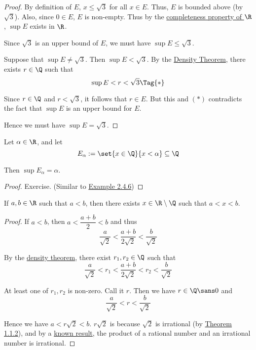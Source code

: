\begin{proof}
  By definition of $E$, $x\leq\sqrt3$ for all $x\in E$. Thus, $E$ is bounded
  above (by $\sqrt3$). Also, since $0\in E$, $E$ is non-empty. Thus by the
  \href{f330cf9}{completeness property of $\R$}, $\sup E$ exists in $\R$.

  Since $\sqrt3$ is an upper bound of $E$, we must have $\sup E\leq\sqrt3$.

  Suppose that $\sup E\neq\sqrt3$. Then $\sup E<\sqrt3$. By the
  \href{d0c9c52}{Density Theorem}, there exists $r\in\Q$ such that
  \begin{equation*}
    \sup E<r<\sqrt3\Tag{*}
  \end{equation*}

  Since $r\in\Q$ and $r<\sqrt3$, it follows that $r\in E$. But this and $(*)$
  contradicts the fact that $\sup E$ is an upper bound for $E$.

  Hence we must have $\sup E=\sqrt3$.
\end{proof}

\label{d4d76b6}

Let $\alpha\in\R$, and let
$$
  E_\alpha:=\set{x\in\Q}{x<\alpha}\subseteq\Q
$$

Then $\sup E_\alpha=\alpha$.

\begin{proof}
  Exercise. (Similar to \href{ade99b7}{Example 2.4.6})
\end{proof}

\label{b0d86cf}

If $a,b\in\R$ such that $a<b$, then there exists $x\in\R\setminus\Q$ such that
$a<x<b$.

\begin{proof}
  If $a<b$, then $a<\dfrac{a+b}2<b$ and thus
  $$
    \frac a{\sqrt2}<\frac{a+b}{2\sqrt2}<\frac b{\sqrt2}
  $$

  By the \href{d0c9c52}{density theorem}, there exist $r_1,r_2\in\Q$ such that
  $$
    \frac a{\sqrt2}<r_1<\frac{a+b}{2\sqrt2}<r_2<\frac b{\sqrt2}
  $$

  At least one of $r_1,r_2$ is non-zero. Call it $r$. Then we have $r\in\Q\sans0$
  and
  $$
    \frac a{\sqrt2}<r<\frac b{\sqrt2}
  $$

  Hence we have $a<r\sqrt2<b$. $r\sqrt2$ is because $\sqrt2$ is irrational (by
  \href{c2585a1}{Theorem 1.1.2}), and by a \href{d9d3f10}{known result}, the
  product of a rational number and an irrational number is irrational.
\end{proof}

